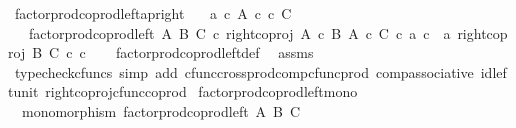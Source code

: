 \begin{isabellebody}
\isanewline
{}\isamarkupfalse%
\ factor{\isacharunderscore}{\kern0pt}prod{\isacharunderscore}{\kern0pt}coprod{\isacharunderscore}{\kern0pt}left{\isacharunderscore}{\kern0pt}ap{\isacharunderscore}{\kern0pt}right{\isacharcolon}{\kern0pt}\isanewline
\ \ \ {\isachardoublequoteopen}a\ {\isasymin}\isactrlsub c\ A{\isachardoublequoteclose}\ {\isachardoublequoteopen}c\ {\isasymin}\isactrlsub c\ C{\isachardoublequoteclose}\isanewline
\ \ \ {\isachardoublequoteopen}factor{\isacharunderscore}{\kern0pt}prod{\isacharunderscore}{\kern0pt}coprod{\isacharunderscore}{\kern0pt}left\ A\ B\ C\ {\isasymcirc}\isactrlsub c\ right{\isacharunderscore}{\kern0pt}coproj\ {\isacharparenleft}{\kern0pt}A\ {\isasymtimes}\isactrlsub c\ B{\isacharparenright}{\kern0pt}\ {\isacharparenleft}{\kern0pt}A\ {\isasymtimes}\isactrlsub c\ C{\isacharparenright}{\kern0pt}\ {\isasymcirc}\isactrlsub c\ {\isasymlangle}a{\isacharcomma}{\kern0pt}\ c{\isasymrangle}\ {\isacharequal}{\kern0pt}\ {\isasymlangle}a{\isacharcomma}{\kern0pt}\ right{\isacharunderscore}{\kern0pt}coproj\ B\ C\ {\isasymcirc}\isactrlsub c\ c{\isasymrangle}{\isachardoublequoteclose}\isanewline
%
\isadelimproof
\ \ %
\endisadelimproof
%
\isatagproof
{}\isamarkupfalse%
\ factor{\isacharunderscore}{\kern0pt}prod{\isacharunderscore}{\kern0pt}coprod{\isacharunderscore}{\kern0pt}left{\isacharunderscore}{\kern0pt}def\ \isamarkupfalse%
\ assms\ \isanewline
\ \ \isamarkupfalse%
\ {\isacharparenleft}{\kern0pt}typecheck{\isacharunderscore}{\kern0pt}cfuncs{\isacharcomma}{\kern0pt}\ simp\ add{\isacharcolon}{\kern0pt}\ cfunc{\isacharunderscore}{\kern0pt}cross{\isacharunderscore}{\kern0pt}prod{\isacharunderscore}{\kern0pt}comp{\isacharunderscore}{\kern0pt}cfunc{\isacharunderscore}{\kern0pt}prod\ comp{\isacharunderscore}{\kern0pt}associative{}\ id{\isacharunderscore}{\kern0pt}left{\isacharunderscore}{\kern0pt}unit{}\ right{\isacharunderscore}{\kern0pt}coproj{\isacharunderscore}{\kern0pt}cfunc{\isacharunderscore}{\kern0pt}coprod{\isacharparenright}{\kern0pt}%
\endisatagproof
{\isafoldproof}%
%
\isadelimproof
\isanewline
%
\endisadelimproof
\isanewline
{}\isamarkupfalse%
\ factor{\isacharunderscore}{\kern0pt}prod{\isacharunderscore}{\kern0pt}coprod{\isacharunderscore}{\kern0pt}left{\isacharunderscore}{\kern0pt}mono{\isacharcolon}{\kern0pt}\isanewline
\ \ {\isachardoublequoteopen}monomorphism\ {\isacharparenleft}{\kern0pt}factor{\isacharunderscore}{\kern0pt}prod{\isacharunderscore}{\kern0pt}coprod{\isacharunderscore}{\kern0pt}left\ A\ B\ C{\isacharparenright}{\kern0pt}{\isachardoublequoteclose}\isanewline

\end{isabellebody}
